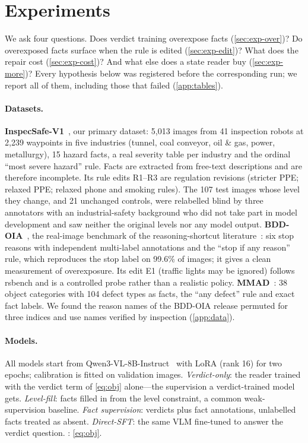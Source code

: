 \section{Experiments}
\label{sec:exp}

We ask four questions. Does verdict training overexpose facts (\cref{sec:exp-over})? Do overexposed facts surface when the rule is edited (\cref{sec:exp-edit})? What does the repair cost (\cref{sec:exp-cost})? And what else does a state reader buy (\cref{sec:exp-more})? Every hypothesis below was registered before the corresponding run; we report all of them, including those that failed (\cref{app:tables}).

\paragraph{Datasets.} \textbf{InspecSafe-V1}~\cite{inspecsafe}, our primary dataset: 5,013 images from 41 inspection robots at 2,239 waypoints in five industries (tunnel, coal conveyor, oil \& gas, power, metallurgy), 15 hazard facts, a real severity table per industry and the ordinal ``most severe hazard'' rule. Facts are extracted from free-text descriptions and are therefore incomplete. Its rule edits R1--R3 are regulation revisions (stricter PPE; relaxed PPE; relaxed phone and smoking rules). The 107 test images whose level they change, and 21 unchanged controls, were relabelled blind by three annotators with an industrial-safety background who did not take part in model development and saw neither the original levels nor any model output. \textbf{BDD-OIA}~\cite{xu2020bddoia}, the real-image benchmark of the reasoning-shortcut literature~\cite{bortolotti2024rsbench}: six stop reasons with independent multi-label annotations and the ``stop if any reason'' rule, which reproduces the stop label on 99.6\% of images; it gives a clean measurement of overexposure. Its edit E1 (traffic lights may be ignored) follows rsbench and is a controlled probe rather than a realistic policy. \textbf{MMAD}~\cite{jiang2025mmad}: 38 object categories with 104 defect types as facts, the ``any defect'' rule and exact fact labels. We found the reason names of the BDD-OIA release permuted for three indices and use names verified by inspection (\cref{app:data}).

\paragraph{Models.} All models start from Qwen3-VL-8B-Instruct~\cite{qwen3vl} with LoRA (rank 16) for two epochs; calibration is fitted on validation images. \emph{Verdict-only}: the \lux reader trained with the verdict term of \cref{eq:obj} alone---the supervision a verdict-trained model gets. \emph{Level-fill}: facts filled in from the level constraint, a common weak-supervision baseline. \emph{Fact supervision}: verdicts plus fact annotations, unlabelled facts treated as absent. \emph{Direct-SFT}: the same VLM fine-tuned to answer the verdict question. \lux: \cref{eq:obj}.

